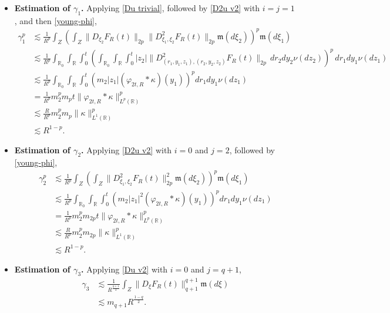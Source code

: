 \documentclass[12pt]{article}
\def\bR{\mathbb{R}}
\newcommand{\les}{\lesssim}
\def\k{\kappa}
\newcommand{\fm}{\mathfrak{m}}
\begin{document}
\begin{itemize}
\item{\bf Estimation of $\gamma_1$.} Applying \eqref{Du trivial}, followed by \eqref{D2u v2} with $i = j = 1$, and then \eqref{young-phi},
\begin{align*}
\gamma_1^p & \les \frac{1}{R^p} \int_Z \left( \int_Z \|D_{\xi_2}F_R(t) \|_{2p}
\|D^2_{\xi_1,\xi_2} F_R(t) \|_{2p}\fm(d\xi_2)\right)^{p}\fm(d\xi_1)\\
& \les \frac{1}{R^p} \int_{\bR_0}\int_{\bR} \int_{0}^t \left( \int_{\bR_0} \int_{\bR} \int_{0}^t |z_2|
\|D^2_{(r_1,y_1,z_1),(r_2,y_2,z_2)} F_R(t) \|_{2p} \, dr_2 dy_2 \nu(dz_2)\right)^{p} \, dr_1 dy_1 \nu(dz_1)\\
& \les \frac{1}{R^p}  \int_{\bR_0} \int_{\bR} \int_{0}^t \left(m_2|z_1| (\varphi_{2t,R} * \k)(y_1) \right)^p dr_1 dy_1 \nu(dz_1)\\
& = \frac{1}{R^p} m_2^p m_p t \| \varphi_{2t,R} * \k \|_{L^p(\bR)}^p \\
& \les \frac{R}{R^p} m_2^p m_p\| \k\|_{L^1(\bR)}^p \\ 
& \les R^{1-p}.
\end{align*}



\item {\bf Estimation of $\gamma_2$.} Applying \eqref{D2u v2} with $i = 0$ and $j = 2$, followed by \eqref{young-phi},
\begin{align*}
\gamma_2^p & \les \frac{1}{R^p} \int_Z \left( \int_Z
\|D^2_{\xi_1,\xi_2} F_R(t) \|_{2p}^2\fm(d\xi_2)\right)^{p}\fm(d\xi_1)\\
& \les \frac{1}{R^p}  \int_{\bR_0} \int_{\bR} \int_{0}^t \left(m_2|z_1|^2 (\varphi_{2t,R} * \k)(y_1) \right)^p dr_1 dy_1 \nu(dz_1)\\
& = \frac{1}{R^p} m_2^p m_{2p} t \| \varphi_{2t,R} * \k \|_{L^p(\bR)}^p \\
& \les \frac{R}{R^p} m_2^p m_{2p} \| \k\|_{L^1(\bR)}^p \\ 
& \les R^{1-p}.
\end{align*}

\item {\bf Estimation of $\gamma_3$.} Applying \eqref{Du v2} with $i=0$ and $j=q+1$,
\begin{align*}
\gamma_3 & \les \frac{1}{R^{\frac{q+1}{2}}} \int_Z \|D_{\xi}F_R(t) \|^{q+1}_{q+1} \fm(d\xi)\\
& \les m_{q+1} R^{\frac{1-q}{2}}.
\end{align*}


\end{itemize}
\end{document}
